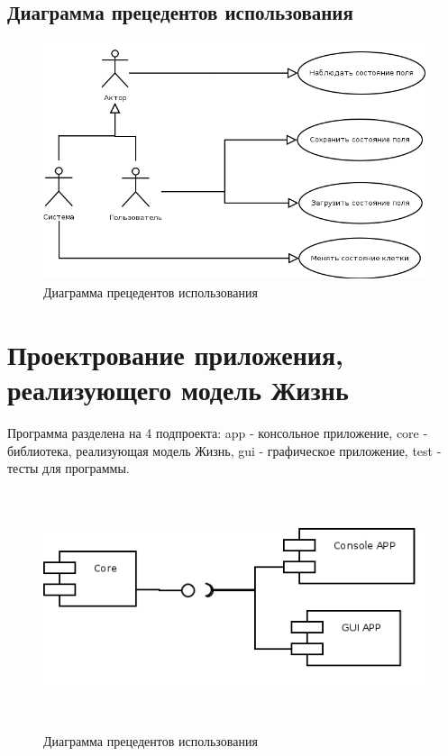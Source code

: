 \documentclass[a4paper]{article}
\begin{document}
\subsection{Диаграмма прецедентов использования}

\begin{figure}[H]
	\begin{center}
		\includegraphics[scale=0.4, height=7cm]{Diagrams/Diagram1}
		\caption{Диаграмма прецедентов использования} 
		\label{pic:Diagram1} %
	\end{center}
\end{figure}

\section{Проектрование приложения, реализующего модель Жизнь}
Программа разделена на 4 подпроекта: app - консольное приложение, core - библиотека, реализующая модель Жизнь, gui - графическое приложение, test - тесты для программы.

\begin{figure}[H]
	\begin{center}
		\includegraphics[scale=0.4, height=7cm]{Diagrams/Diagram2}
		\caption{Диаграмма прецедентов использования} 
		\label{pic:Diagram2} %
	\end{center}
\end{figure}
\end{document}
